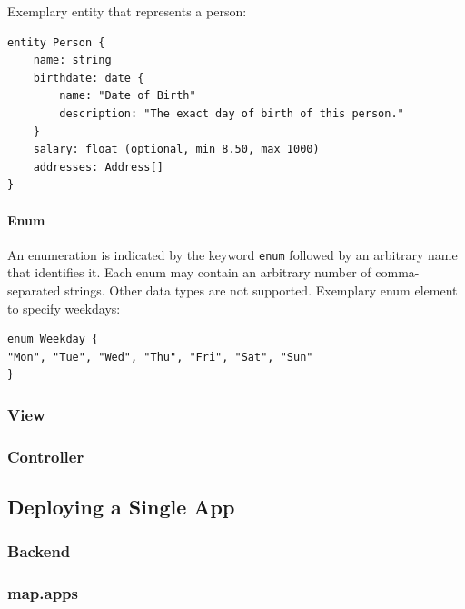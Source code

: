 Exemplary entity that represents a person:
\begin{lstlisting}
entity Person {
	name: string
	birthdate: date {
		name: "Date of Birth"
		description: "The exact day of birth of this person."
	}
	salary: float (optional, min 8.50, max 1000)
	addresses: Address[]
}
\end{lstlisting}

\paragraph{Enum}
An enumeration is indicated by the keyword \lstinline!enum! followed by an arbitrary name that identifies it. Each enum may contain an arbitrary number of comma-separated strings. Other data types are not supported.
Exemplary enum element to specify weekdays:
\begin{lstlisting}
enum Weekday {
"Mon", "Tue", "Wed", "Thu", "Fri", "Sat", "Sun"
}
\end{lstlisting}


\subsubsection{View} 
\label{subsubsec:View}

\subsubsection{Controller} 
\label{subsubsec:Controller}


\subsection{Deploying a Single App}
\label{subsec:SingleAppDep}

\subsubsection{Backend} 
\label{subsubsec:Backend}

\subsubsection{map.apps} 
\label{subsubsec:mapapps}

